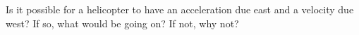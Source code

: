         Is it possible for a helicopter to have an acceleration
        due east and a velocity due west? If so, what would be going
        on? If not, why not?
